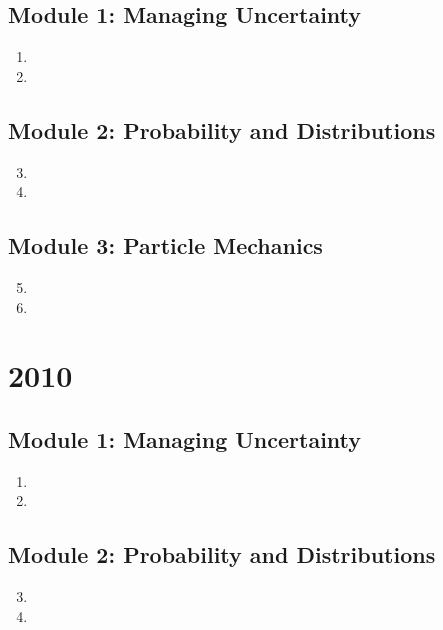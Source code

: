\documentclass[fleqn,titlepage]{book}
\numberwithin{equation}{section}
\theoremstyle{plain}
\theoremstyle{definition}
\theoremstyle{remark}
\begin{document}
\section{Module 1: Managing Uncertainty}
\begin{enumerate}[label=\bfseries  \arabic*.]\setcounter{enumi}{0}
\item 
\item 
\end{enumerate}
\section{Module 2: Probability and Distributions}
\begin{enumerate}[label=\bfseries  \arabic*.]\setcounter{enumi}{2}
\item 
\item 
\end{enumerate}
\section{Module 3: Particle Mechanics}
\begin{enumerate}[label=\bfseries  \arabic*.]\setcounter{enumi}{4}
\item 
\item 
\end{enumerate}

\chapter{2010}
\section{Module 1: Managing Uncertainty}
\begin{enumerate}[label=\bfseries  \arabic*.]\setcounter{enumi}{0}
\item 
\item 
\end{enumerate}
\section{Module 2: Probability and Distributions}
\begin{enumerate}[label=\bfseries  \arabic*.]\setcounter{enumi}{2}
\item 
\item 
\end{enumerate}
\end{document}
